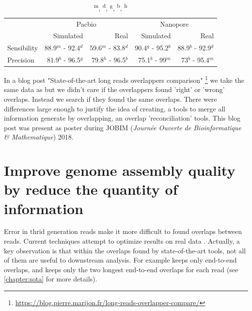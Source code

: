 \documentclass[main.tex]{subfiles}
\begin{document}
\begin{table}[ht]
    \centering
    \begin{tabular}{l|rr|rr}
                & \multicolumn{2}{c}{Pacbio}                & \multicolumn{2}{c}{Nanopore}              \\ 
                & Simulated           & Real                & Simulated         & Real                  \\ \hline
    Sensibility & 88.9$^m$ - 92.4$^d$ & 59.6$^m$ - 83.8$^d$ & 90.4$^g$ - 95.2$^b$ & 88.9$^b$ - 92.9$^d$ \\
    Precision   & 81.9$^b$ - 96.5$^g$ & 79.8$^h$ - 96.5$^b$ & 75.1$^b$ - 99$^m$   & 73$^b$ - 95.4$^m$   \\
    \end{tabular}
    \caption{\textsuperscript{m}, \textsuperscript{d}, \textsuperscript{g}, \textsuperscript{b}, \textsuperscript{h}\mhap}
    \label{preassembly:tab:ovl_result}
\end{table}

In a blog post "State-of-the-art long reads overlappers comparison" \footnote{\url{https://blog.pierre.marijon.fr/long-reads-overlapper-compare/}} we take the same data as \cite{ovl_bench} but we didn't care if the overlappers found 'right' or 'wrong' overlaps. Instead we search if they found the same overlaps. There were differences large enough to justify the idea of creating, a tools to merge all information generate by overlapping, an overlap 'reconciliation' tools. This blog post was present as poster during JOBIM (\textit{Journée Ouverte de Bioinformatique \& Mathematique}) 2018.



\section{Improve genome assembly quality by reduce the quantity of information}

Error in thrid generation reads make it more difficult to found overlaps between reads. Current techniques attempt to optimize results on real data \cite{ovl_bench}.
Actually, a key observation is that within the overlaps found by state-of-the-art tools, not all of them are useful to downstream analysis. For example \miniasm keeps only end-to-end overlaps, and \canu keeps only the two longest end-to-end overlaps for each read (see \ref{chapter:sota} for more details).
\end{document}

